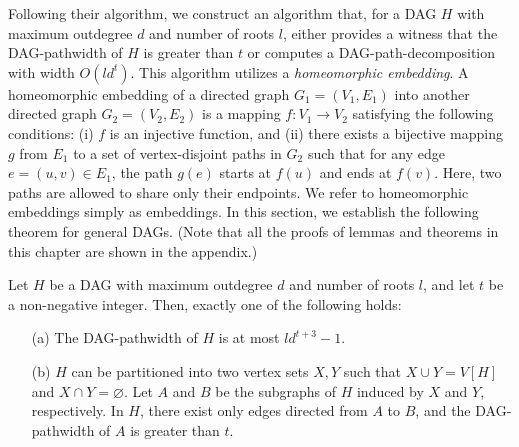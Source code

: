 \documentclass[runningheads]{llncs}
\theoremstyle{plain}
\theoremstyle{definition}
\begin{document}
Following their algorithm, we construct an algorithm that, for a DAG $H$ with maximum outdegree $d$ and number of roots $l$, either provides a witness that the DAG-pathwidth of $H$ is greater than $t$ or computes a DAG-path-decomposition with width $O(ld^t)$. This algorithm utilizes a \emph{homeomorphic embedding}. A homeomorphic embedding of a directed graph $G_1 = (V_1, E_1)$ into another directed graph $G_2 = (V_2, E_2)$ is a mapping $f: V_1 \rightarrow V_2$ satisfying the following conditions: (i) $f$ is an injective function, and (ii) there exists a bijective mapping $g$ from $E_1$ to a set of vertex-disjoint paths in $G_2$ such that for any edge $e = (u, v) \in E_1$, the path $g(e)$ starts at $f(u)$ and ends at $f(v)$.
Here, two paths are allowed to share only their endpoints. We refer to homeomorphic embeddings simply as embeddings. In this section, we establish the following theorem for general DAGs.
(Note that all the proofs of lemmas and theorems in this chapter are shown in the appendix.)

\begin{theorem}\label{approximation3}
    Let $H$ be a DAG with maximum outdegree $d$ and number of roots $l$, and let $t$ be a non-negative integer. Then, exactly one of the following holds:
    \begin{enumerate}
        \item[(a)] The DAG-pathwidth of $H$ is at most $ld^{t+3}-1$.
        \item[(b)] $H$ can be partitioned into two vertex sets $X, Y$ such that $X \cup Y = V[H]$ and $X \cap Y = \varnothing$. Let $A$ and $B$ be the subgraphs of $H$ induced by $X$ and $Y$, respectively. In $H$, there exist only edges directed from $A$ to $B$, and the DAG-pathwidth of $A$ is greater than $t$.
    
    \end{enumerate}
\end{theorem}
\end{document}
